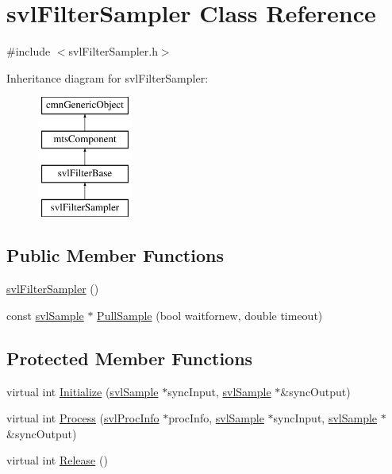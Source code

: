 \hypertarget{classsvl_filter_sampler}{\section{svl\-Filter\-Sampler Class Reference}
\label{classsvl_filter_sampler}
}


{\ttfamily \#include $<$svl\-Filter\-Sampler.\-h$>$}

Inheritance diagram for svl\-Filter\-Sampler\-:\begin{figure}[H]
\begin{center}
\leavevmode
\includegraphics[height=4.000000cm]{d8/d7f/classsvl_filter_sampler}
\end{center}
\end{figure}
\subsection*{Public Member Functions}
\begin{DoxyCompactItemize}
\item 
\hyperlink{classsvl_filter_sampler_a52830e19a37a3f99618a48d4024e566e}{svl\-Filter\-Sampler} ()
\item 
const \hyperlink{classsvl_sample}{svl\-Sample} $\ast$ \hyperlink{classsvl_filter_sampler_ab97aeed45583e3793d4a88d34220d299}{Pull\-Sample} (bool waitfornew, double timeout)
\end{DoxyCompactItemize}
\subsection*{Protected Member Functions}
\begin{DoxyCompactItemize}
\item 
virtual int \hyperlink{classsvl_filter_sampler_a06c0ba3257ff6d77b4a581fff88145eb}{Initialize} (\hyperlink{classsvl_sample}{svl\-Sample} $\ast$sync\-Input, \hyperlink{classsvl_sample}{svl\-Sample} $\ast$\&sync\-Output)
\item 
virtual int \hyperlink{classsvl_filter_sampler_a99815e0afecdce2407de109adf1bacdb}{Process} (\hyperlink{structsvl_proc_info}{svl\-Proc\-Info} $\ast$proc\-Info, \hyperlink{classsvl_sample}{svl\-Sample} $\ast$sync\-Input, \hyperlink{classsvl_sample}{svl\-Sample} $\ast$\&sync\-Output)
\item 
virtual int \hyperlink{classsvl_filter_sampler_a65c26c24a9445bad7dc634c5ef7e4eb7}{Release} ()
\end{DoxyCompactItemize}
